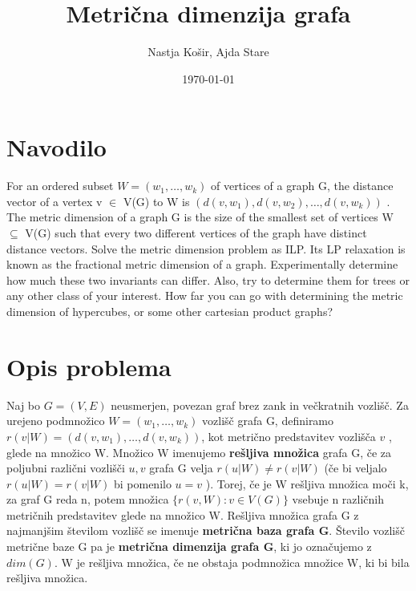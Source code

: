 \documentclass[a4paper]{report}
\title{Metrična dimenzija grafa }
\author{Nastja Košir, Ajda Stare}
\date{\today}
\begin{document}
	\maketitle

\section*{Navodilo}
For an ordered subset $W = (w_1 , \dots, w_k ) $ of vertices of a graph G, the distance vector of a vertex v $\in$ V(G)  to  W  is  $(d(v, w_1 ), d(v, w_2 ), \dots, d(v, w_k ))$ . The metric dimension of a graph G is the size of the smallest set of vertices W  $\subseteq $ V(G) such that every two different vertices of the graph have distinct distance vectors. Solve the metric dimension problem as ILP. Its LP relaxation is known as the fractional metric dimension of a graph. Experimentally determine how much these two invariants can differ. Also, try to determine them for trees or any other class of your interest. How far you can go with determining the metric dimension of hypercubes, or some other cartesian product graphs?\\

\section*{Opis problema}
Naj bo $G=(V,E)$ neusmerjen, povezan graf brez zank in večkratnih vozlišč. Za urejeno podmnožico $ W =(w_1 , \dots, w_k )$ vozlišč grafa G, definiramo\\$r(v|W) = (d(v,w_1),\dots, d(v,w_k))$, kot  metrično predstavitev vozlišča $v$ , glede na množico W. Množico W imenujemo \textbf{rešljiva množica} grafa G, če za poljubni  različni vozlišči $u,v$ grafa G velja $r(u|W)\neq r(v|W)$ (če bi veljalo $r(u|W)= r(v|W)$ bi pomenilo $u = v$ ). Torej, če je W rešljiva množica moči k, za graf G reda n, potem množica $\{r(v,W): v\in V(G)\}$ vsebuje n različnih metričnih predstavitev glede na množico W. Rešljiva množica grafa G z najmanjšim številom vozlišč se imenuje \textbf{metrična baza grafa G}. Število vozlišč metrične baze G pa je \textbf{metrična dimenzija grafa G}, ki jo označujemo z \textbf{$dim(G)$}. W je rešljiva množica, če ne obstaja podmnožica množice W, ki bi bila rešljiva množica.  

\end{document}
